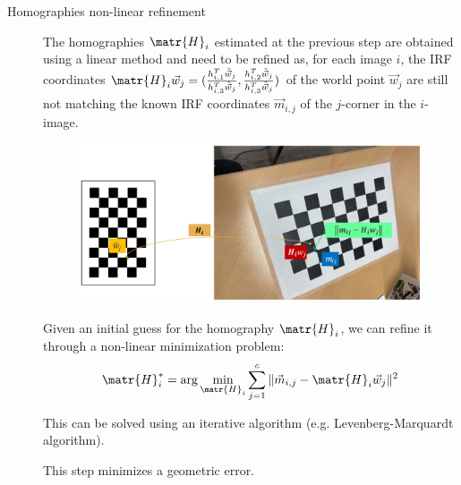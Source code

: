 \begin{description}
    \item[Homographies non-linear refinement]
        The homographies $\matr{H}_i$ estimated at the previous step are obtained using a linear method and need to be refined as, for each image $i$, 
        the IRF coordinates $\matr{H}_i\vec{w}_j = (\frac{h_{i, 1}^T \tilde{\vec{w}}_j}{h_{i, 3}^T \tilde{\vec{w}}_j}, \frac{h_{i, 2}^T \tilde{\vec{w}}_j}{h_{i, 3}^T \tilde{\vec{w}}_j})$
        of the world point $\vec{w}_j$ are still not matching the known IRF coordinates $\vec{m}_{i,j}$ of the $j$-corner in the $i$-image.
        \begin{figure}[H]
            \centering
            \includegraphics[width=0.7\linewidth]{./img/_homography_refinement.pdf}
        \end{figure}

        Given an initial guess for the homography $\matr{H}_i$, we can refine it through a non-linear minimization problem:
        \[ \matr{H}_i^* = \arg\min_{\matr{H}_i} \sum_{j=1}^{c} \Vert \vec{m}_{i,j} - \matr{H}_i \vec{w}_j \Vert^2 \]

        This can be solved using an iterative algorithm (e.g. Levenberg-Marquardt algorithm).

        \begin{remark}
            This step minimizes a geometric error.
        \end{remark}


\end{description}
